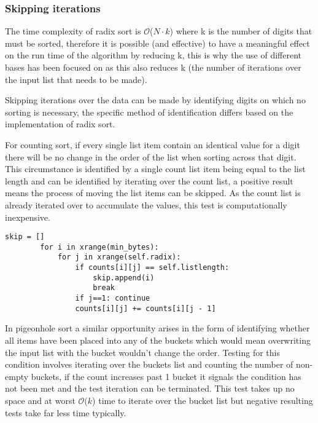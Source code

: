 \documentclass[12pt]{article}
\begin{document}
\subsubsection{Skipping iterations}
\label{sssec:skip}
The time complexity of radix sort is $\mathcal{O}${($N \cdot k$)} where k is the number of digits that must be sorted, therefore it is possible (and effective) to have a meaningful effect on the run time of the algorithm by reducing k, this is why the use of different bases has been focused on as this also reduces k (the number of iterations over the input list that needs to be made).
\par
Skipping iterations over the data can be made by identifying digits on which no sorting is necessary, the specific method of identification differs based on the implementation of radix sort.
\par
For counting sort, if every single list item contain an identical value for a digit there will be no change in the order of the list when sorting across that digit. This circumstance is identified by a single count list item being equal to the list length and can be identified by iterating over the count list, a positive result means the process of moving the list items can be skipped. As the count list is already iterated over to accumulate the values, this test is computationally inexpensive.
\begin{table}[H]
	\centering
	\begin{lstlisting}[caption={Identifying if all items have an identical value for each digit in LSD counting sort. The same process is used for MSD counting sort with sub list length used instead of total list length},captionpos=b]
		skip = []
		for i in xrange(min_bytes):
			for j in xrange(self.radix):
				if counts[i][j] == self.listlength:
					skip.append(i)
					break
				if j==1: continue
				counts[i][j] += counts[i][j - 1]
	\end{lstlisting}
\end{table}
\par
In pigeonhole sort a similar opportunity arises in the form of identifying whether all items have been placed into any of the buckets which would mean overwriting the input list with the bucket wouldn't change the order. Testing for this condition involves iterating over the buckets list and counting the number of non-empty buckets, if the count increases past 1 bucket it signals the condition has not been met and the test iteration can be terminated. This test takes up no space and at worst $\mathcal{O}${($k$)} time to iterate over the bucket list but negative resulting tests take far less time typically.
\end{document}
